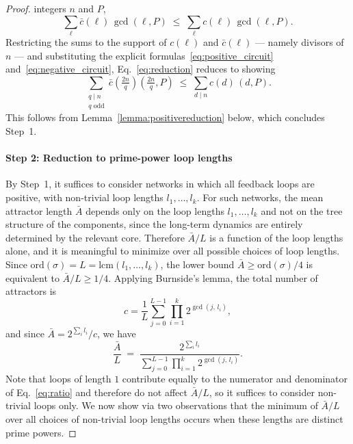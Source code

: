 \documentclass[11pt, reqno]{elsarticle}%
\theoremstyle{plain}
\begin{document}
\begin{proof}
integers $n$ and $P$,
\begin{equation}
  \sum_{\ell} \bar{c}(\ell)\,\gcd(\ell,P) \;\le\; 
  \sum_{\ell} c(\ell)\,\gcd(\ell,P).
  \label{eq:reduction}
\end{equation}
Restricting the sums to the support of $c(\ell)$ and $\bar{c}(\ell)$ 
— namely divisors of $n$ — and substituting the explicit 
formulas~\eqref{eq:positive_circuit} and~\eqref{eq:negative_circuit}, 
Eq.~\eqref{eq:reduction} reduces to showing
\begin{equation}
  \sum_{\substack{q\mid n\\q\text{ odd}}}
  \bar{c}\!\left(\tfrac{2n}{q}\right)
  \left(\tfrac{2n}{q},P\right)
  \;\le\;
  \sum_{d\mid n} c(d)\,(d,P).
  \label{eq:neg_vs_pos}
\end{equation}
This follows from Lemma~\ref{lemma:positivereduction}
below, which concludes Step~1.

\paragraph{Step 2: Reduction to prime-power loop lengths}
By Step~1, it suffices to consider networks in which all feedback 
loops are positive, with non-trivial loop lengths $l_1,\ldots,l_k$. 
For such networks, the mean attractor length $\bar{A}$ depends only 
on the loop lengths $l_1,\ldots,l_k$ and not on the tree structure 
of the components, since the long-term dynamics are entirely 
determined by the relevant core. Therefore $\bar{A}/L$ is a 
function of the loop lengths alone, and it is meaningful to minimize 
over all possible choices of loop lengths. Since 
$\mathrm{ord}(\sigma) = L = \mathrm{lcm}(l_1,\ldots,l_k)$, the 
lower bound $\bar{A} \ge \mathrm{ord}(\sigma)/4$ is equivalent to 
$\bar{A}/L \ge 1/4$. Applying Burnside's lemma, 
the total number of attractors is
\begin{equation}
  c = \frac{1}{L}\sum_{j=0}^{L-1}\prod_{i=1}^{k} 
  2^{\gcd(j,\,l_i)},
  \label{eq:burnside_lemma}
\end{equation}
and since $\bar{A} = 2^{\sum_i l_i}/c$, we have
\begin{equation}
  \frac{\bar{A}}{L}
  \;=\;
  \frac{2^{\sum_i l_i}}{\sum_{j=0}^{L-1}\prod_{i=1}^{k} 
  2^{\gcd(j,\,l_i)}}.
  \label{eq:ratio}
\end{equation}
Note that loops of length $1$ contribute equally to the numerator 
and denominator of Eq.~\eqref{eq:ratio} and therefore do not affect 
$\bar{A}/L$, so it suffices to consider non-trivial loops only. We 
now show via two observations that the minimum of $\bar{A}/L$ over 
all choices of non-trivial loop lengths occurs when these lengths 
are distinct prime powers.


\end{proof}
\end{document}
